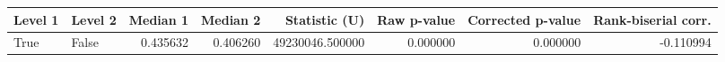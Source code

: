\begin{tabular}{llrrrrrr}
\toprule
Level 1 & Level 2 & Median 1 & Median 2 & Statistic (U) & Raw p-value & Corrected p-value & Rank-biserial corr. \\
\midrule
True & False & 0.435632 & 0.406260 & 49230046.500000 & 0.000000 & 0.000000 & -0.110994 \\
\bottomrule
\end{tabular}
